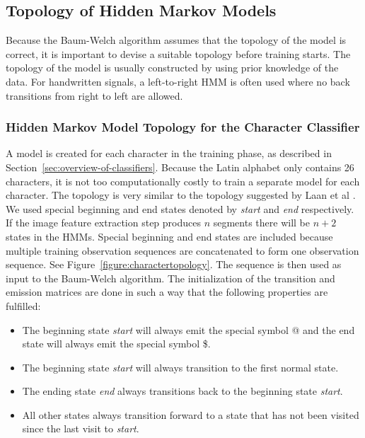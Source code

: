 
\subsection{Topology of Hidden Markov Models}

Because the Baum-Welch algorithm assumes that the topology of the model is correct, it is important to devise a suitable topology before training starts. 
The topology of the model is usually constructed by using prior knowledge of the data. 
For handwritten signals, a left-to-right HMM is often used where no back transitions from right to left are allowed. \cite{Suen}

\subsubsection{Hidden Markov Model Topology for the Character Classifier}

A model is created for each character in the training phase, as described in Section~\ref{sec:overview-of-classifiers}.
Because the Latin alphabet only contains 26 characters, it is not too computationally costly to train a separate model for each character.
The topology is very similar to the topology suggested by Laan et al \cite{Laan}. 
We used special beginning and end states denoted by \textit{start} and \textit{end} respectively.
If the image feature extraction step produces $n$ segments there will be $n + 2$ states in the HMMs.
Special beginning and end states are included because multiple training observation sequences are concatenated to form one observation sequence.
See Figure~\ref{figure:charactertopology}.
The sequence is then used as input to the Baum-Welch algorithm.
The initialization of the transition and emission matrices are done in such a way that the following properties are fulfilled:

\begin{itemize}
 \item The beginning state \textit{start} will always emit the special symbol @ and the end state will always emit the special symbol \$.
 \item The  beginning state \textit{start} will always transition to the first normal state.
 \item The ending state \textit{end} always transitions back to the beginning state \textit{start}.
 \item All other states always transition forward to a state that has not been visited since the last visit to \textit{start}.
\end{itemize}

